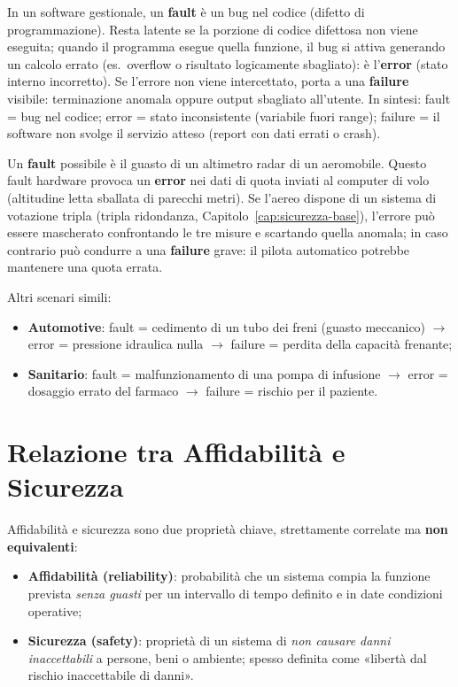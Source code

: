\begin{ex}
In un software gestionale, un \textbf{fault} è un bug nel codice (difetto di programmazione). Resta latente se la porzione di codice difettosa non viene eseguita; quando il programma esegue quella funzione, il bug si attiva generando un calcolo errato (es.\ overflow o risultato logicamente sbagliato): è l'\textbf{error} (stato interno incorretto). Se l'errore non viene intercettato, porta a una \textbf{failure} visibile: terminazione anomala oppure output sbagliato all'utente. In sintesi: fault = bug nel codice; error = stato inconsistente (variabile fuori range); failure = il software non svolge il servizio atteso (report con dati errati o crash).
\end{ex}

\begin{ex}
Un \textbf{fault} possibile è il guasto di un altimetro radar di un aeromobile. Questo fault hardware provoca un \textbf{error} nei dati di quota inviati al computer di volo (altitudine letta sballata di parecchi metri). Se l'aereo dispone di un sistema di votazione tripla (tripla ridondanza, Capitolo~\ref{cap:sicurezza-base}), l'errore può essere mascherato confrontando le tre misure e scartando quella anomala; in caso contrario può condurre a una \textbf{failure} grave: il pilota automatico potrebbe mantenere una quota errata.
\end{ex}

Altri scenari simili:
\begin{itemize}
    \item \textbf{Automotive}: fault = cedimento di un tubo dei freni (guasto meccanico) $\to$ error = pressione idraulica nulla $\to$ failure = perdita della capacità frenante;
    \item \textbf{Sanitario}: fault = malfunzionamento di una pompa di infusione $\to$ error = dosaggio errato del farmaco $\to$ failure = rischio per il paziente.
\end{itemize}

\section{Relazione tra Affidabilità e Sicurezza}
Affidabilità e sicurezza sono due proprietà chiave, strettamente correlate ma \textbf{non equivalenti}:
\begin{itemize}
    \item \textbf{Affidabilità (reliability)}: probabilità che un sistema compia la funzione prevista \emph{senza guasti} per un intervallo di tempo definito e in date condizioni operative;
    \item \textbf{Sicurezza (safety)}: proprietà di un sistema di \emph{non causare danni inaccettabili} a persone, beni o ambiente; spesso definita come «libertà dal rischio inaccettabile di danni».
\end{itemize}

